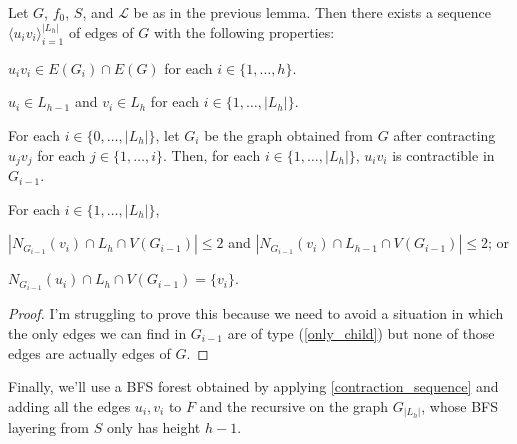 \documentclass{patmorin}
\DeclareMathOperator{\height}{height}
\DeclareMathOperator{\depth}{depth}
\begin{document}
\begin{lem}\label{contraction_sequence}
    Let $G$, $f_0$, $S$, and $\mathcal{L}$ be as in the previous lemma.  Then there exists a sequence $\langle u_iv_i\rangle_{i=1}^{|L_h|}$ of edges of $G$ with the following properties:
    \begin{compactenum}
        \item $u_iv_i\in E(G_i)\cap E(G)$ for each $i\in\{1,\ldots,h\}$.
        \item $u_i\in L_{h-1}$ and $v_i\in L_h$ for each $i\in\{1,\ldots,|L_h|\}$.
        \item For each $i\in\{0,\ldots,|L_h|\}$, let $G_i$ be the graph obtained from $G$ after contracting $u_jv_j$ for each $j\in\{1,\ldots,i\}$.  Then, for each $i\in\{1,\ldots,|L_h|\}$,  $u_iv_i$ is contractible in $G_{i-1}$.
        \item For each $i\in\{1,\ldots,|L_h|\}$,
        \begin{compactenum}[(a)]
            \item $|N_{G_{i-1}}(v_i)\cap L_h\cap V(G_{i-1})|\le 2$ and
                $|N_{G_{i-1}}(v_i)\cap L_{h-1}\cap V(G_{i-1})|\le 2$; or
            \item $N_{G_{i-1}}(u_i)\cap L_h\cap V(G_{i-1})=\{v_i\}$. 
        \end{compactenum}
    \end{compactenum}
\end{lem}

\begin{proof}
    I'm struggling to prove this because we need to avoid a situation in which the only edges we can find in $G_{i-1}$ are of type (\ref{only_child}) but none of those edges are actually edges of $G$.
\end{proof}

Finally, we'll use a BFS forest obtained by applying \cref{contraction_sequence} and adding all the edges $u_i,v_i$ to $F$ and the recursive on the graph $G_{|L_h|}$, whose BFS layering from $S$ only has height $h-1$.

%
%
\end{document}
